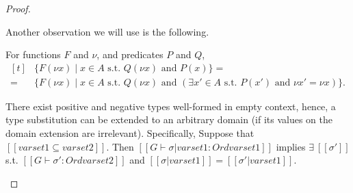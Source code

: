 \begin{proof}
\begin{caseof}
Another observation we will use is the following.
\begin{observation}
  \label{observation:image-replacement}
  For functions $F$ and $\nu$, and
  predicates $P$ and $Q$,
 \[ 
  \begin{aligned}[t]
    &\{F(\nu x) \mid x \in A \text{ s.t. } Q(\nu x) \text{ and } P(x) \} =\\
    = &\{F(\nu x) \mid x \in A \text{ s.t. } Q(\nu x) \text{ and } (\exists x'
        \in A \text{ s.t. } P(x') \text{ and } \nu x' = \nu x) \}.
  \end{aligned}
 \]
\end{observation}

\begin{observation}
  \label{observation:dumb-subs-extension}
  There exist positive and negative types well-formed in empty context,
  hence, a type substitution can be extended to an arbitrary domain
  (if its values on the domain extension are irrelevant). Specifically,
  Suppose that $[[varset1 ⊆ varset2]]$.
  Then $[[G ⊢ σ|varset1 : Ord varset1]]$
  implies
  $\exists~ [[σ']]$ s.t. $[[G ⊢ σ' : Ord varset2]]$ and $[[σ|varset1]] =
  [[σ'|varset1]]$.
\end{observation}



\end{caseof}
\end{proof}
